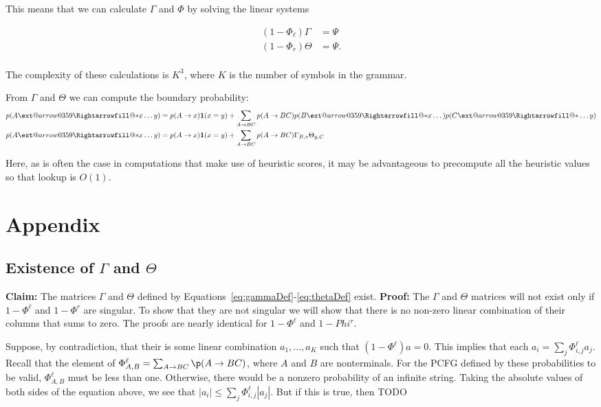 \documentclass{article}
\makeatletter
\newcommand{\xRightarrow}[2][]{\ext@arrow 0359\Rightarrowfill@{#1}{#2}}
\newcommand{\derives}{\xRightarrow{*}}
\makeatother
\begin{document}
This means that we can calculate $\Gamma$ and $\Phi$ by solving the linear systems 

\begin{align}
  (1-\Phi_\ell) \Gamma &= \Psi\\
  (1-\Phi_r) \Theta &= \Psi.\\
\end{align}

The complexity of these calculations is $K^3$, where $K$ is the number
of symbols in the grammar. 

From $\Gamma$ and $\Theta$ we can compute the boundary probability: 
\begin{align}
  p(A \derives x \dots y) &= p(A \rightarrow x) \mathbf{1}(x = y) 
     + \sum_{A \rightarrow B C} p(A \rightarrow B C) p(B \derives x \dots) p(C \derives \dots y)\\
  p(A \derives x \dots y) &= p(A \rightarrow x) \mathbf{1}(x = y) 
     + \sum_{A \rightarrow B C} p(A \rightarrow B C) \Gamma_{B, x} \Theta_{y, C}
\end{align}

Here, as is often the case in computations that make use of heuristic
scores, it may be advantageous to precompute all the heuristic values
so that lookup is $O(1)$. 






\section{Appendix}
\subsection{Existence of $\Gamma$ and $\Theta$}
\textbf{Claim: } The matrices $\Gamma$ and $\Theta$ defined by
Equations~\ref{eq:gammaDef}-\ref{eq:thetaDef} exist.  \textbf{Proof: }
The $\Gamma$ and $\Theta$ matrices will not exist only if
$1-\Phi^\ell$ and $1-\Phi^r$ are singular. To show that they are not
singular we will show that there is no non-zero linear combination of
their columns that sums to zero. The proofs are nearly identical for
$1-\Phi^\ell$ and $1-Phi^r$. 

Suppose, by contradiction, that their is some linear combination $a_1,
..., a_K$ such that $(1-\Phi^\ell) a = 0$. This implies that each $a_i
= \sum_{j} \Phi^\ell_{i, j} a_j$. Recall that the element of
$\Phi^\ell_{A, B} = \sum_{A \rightarrow B C} \p(A \rightarrow B C)$,
where $A$ and $B$ are nonterminals. For the PCFG defined by these
probabilities to be valid, $\Phi^\ell_{A,B}$ must be less than
one. Otherwise, there would be a nonzero probability of an infinite
string. Taking the absolute values of both sides of the equation
above, we see that $|{a_i}| \leq \sum_{j} \Phi^\ell_{i, j} |
a_j|$. But if this is true, then  TODO



\end{document}
